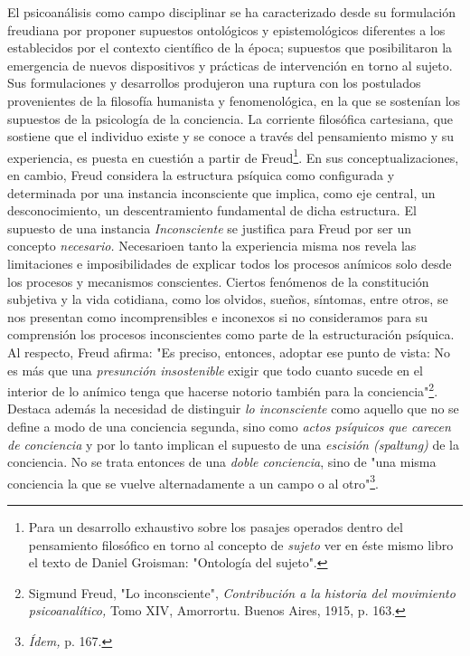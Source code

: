 \documentclass{book}
\begin{document}
El psicoanálisis como campo disciplinar se ha caracterizado desde su
formulación freudiana por proponer supuestos ontológicos y
epistemológicos diferentes a los establecidos por el contexto científico
de la época; supuestos que posibilitaron la emergencia de nuevos
dispositivos y prácticas de intervención en torno al sujeto. Sus
formulaciones y desarrollos produjeron una ruptura con los postulados
provenientes de la filosofía humanista y fenomenológica, en la que se
sostenían los supuestos de la psicología de la conciencia. La corriente
filosófica cartesiana, que sostiene que el individuo existe y se conoce
a través del pensamiento mismo y su experiencia, es puesta en cuestión a
partir de Freud\footnote{Para un desarrollo exhaustivo sobre los pasajes
  operados dentro del pensamiento filosófico en torno al concepto de
  \emph{sujeto} ver en éste mismo libro el texto de Daniel Groisman:
  "Ontología del sujeto".}. En sus conceptualizaciones, en cambio, Freud
considera la estructura psíquica como configurada y determinada por una
instancia inconsciente que implica, como eje central, un
desconocimiento, un descentramiento fundamental de dicha estructura. El
supuesto de una instancia \emph{Inconsciente} se justifica para Freud
por ser un concepto \emph{necesario.} Necesarioen tanto la experiencia
misma nos revela las limitaciones e imposibilidades de explicar todos
los procesos anímicos solo desde los procesos y mecanismos conscientes.
Ciertos fenómenos de la constitución subjetiva y la vida cotidiana, como
los olvidos, sueños, síntomas, entre otros, se nos presentan como
incomprensibles e inconexos si no consideramos para su comprensión los
procesos inconscientes como parte de la estructuración psíquica. Al
respecto, Freud afirma: "Es preciso, entonces, adoptar ese punto de
vista: No es más que una \emph{presunción insostenible} exigir que todo
cuanto sucede en el interior de lo anímico tenga que hacerse notorio
también para la conciencia"\footnote{Sigmund Freud, "Lo inconsciente",
  \emph{Contribución a la historia del movimiento psicoanalítico,} Tomo
  XIV, Amorrortu. Buenos Aires, 1915, p. 163.}. Destaca además la
necesidad de distinguir \emph{lo inconsciente} como aquello que no se
define a modo de una conciencia segunda, sino como \emph{actos psíquicos
que carecen de conciencia} y por lo tanto implican el supuesto de una
\emph{escisión (spaltung)} de la conciencia. No se trata entonces de una
\emph{doble conciencia}, sino de "una misma conciencia la que se vuelve
alternadamente a un campo o al otro"\footnote{\emph{Ídem,} p. 167.}.
\end{document}

